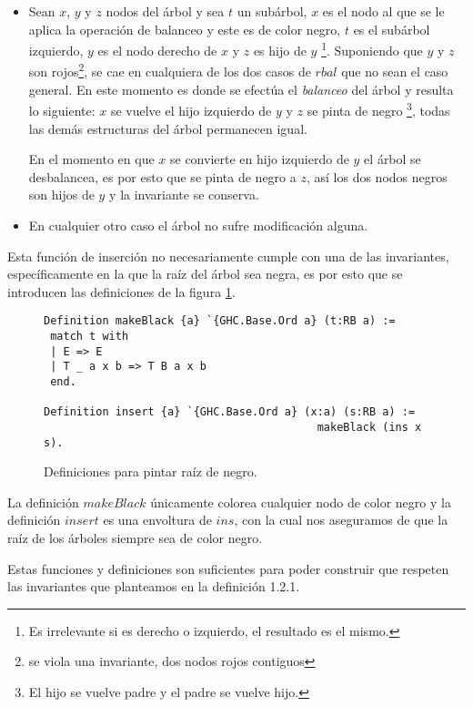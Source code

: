 \begin{itemize}
    \item Sean $x$, $y$ y $z$ nodos del \'arbol y sea $t$ un subárbol, $x$ es el nodo al que se le
    aplica la operaci\'on de balanceo y este es de color negro, $t$ es el subárbol izquierdo, $y$
    es el nodo derecho de $x$ y $z$ es hijo de $y$ \footnote{Es irrelevante si es derecho o
    izquierdo, el resultado es el mismo.}. Suponiendo que $y$ y $z$ son rojos\footnote{se viola una
    invariante, dos nodos rojos contiguos}, se cae en cualquiera de los dos casos de $rbal$ que no
    sean el caso general. En este momento es donde se efectúa el \textit{balanceo} del árbol y
    resulta lo siguiente: $x$ se vuelve el hijo izquierdo de $y$ y $z$ se pinta de negro
    \footnote{El hijo se vuelve padre y el padre se vuelve hijo.}, todas las dem\'as estructuras del
    \'arbol permanecen igual.

    En el momento en que $x$ se convierte en hijo izquierdo de $y$ el \'arbol se desbalancea, es
    por esto que se pinta de negro a $z$, así los dos nodos negros son hijos de $y$ y la invariante
    se conserva.
    \item En cualquier otro caso el \'arbol no sufre modificaci\'on alguna.
\end{itemize}

Esta función de inserción no necesariamente cumple con una de las invariantes, espec\'ificamente
en la que la raíz del árbol sea negra, es por esto que se introducen las definiciones de 
la figura \ref{raiz_negra_func}.

\begin{figure}
\centering
\captionsetup{justification=centering}
\begin{verbatim}
Definition makeBlack {a} `{GHC.Base.Ord a} (t:RB a) :=
 match t with
 | E => E
 | T _ a x b => T B a x b
 end.

Definition insert {a} `{GHC.Base.Ord a} (x:a) (s:RB a) :=
                                          makeBlack (ins x s).
\end{verbatim}
\caption{Definiciones para pintar ra\'iz de negro.}
\label{raiz_negra_func}
\end{figure}

La definici\'on $makeBlack$ únicamente colorea cualquier nodo de color negro y la definición
$insert$ es una envoltura de $ins$, con la cual nos aseguramos de que la ra\'iz de los \'arboles
siempre sea de color negro.

Estas funciones y definiciones son suficientes para poder construir {\arns} que respeten las
invariantes que planteamos en la definici\'on 1.2.1.

